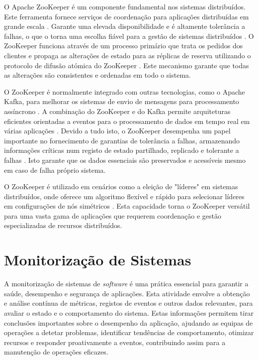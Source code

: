 O Apache ZooKeeper é um componente fundamental nos sistemas distribuídos. Este ferramenta
fornece serviços de coordenação para aplicações distribuídas em grande escala \cite{zookeeper2018}. 
Garante uma elevada disponibilidade e é altamente tolerância a falhas, o que o torna uma escolha 
fiável para a gestão de sistemas distribuídos \cite{zookeeper2021}. O ZooKeeper funciona através de 
um processo primário que trata os pedidos dos clientes e propaga as alterações de estado para as 
réplicas de reserva utilizando o protocolo de difusão atómica do ZooKeeper \cite{zookeeper2011}. 
Este mecanismo garante que todas as alterações são consistentes e ordenadas em todo o sistema.

O ZooKeeper é normalmente integrado com outras tecnologias, como o Apache Kafka, para melhorar os 
sistemas de envio de mensagens para processamento assíncrono \cite{zookeeper2024}. A combinação do 
ZooKeeper e do Kafka permite arquiteturas eficientes orientadas a eventos para o processamento de 
dados em tempo real em várias aplicações \cite{zookeeper2021b}. Devido a tudo isto, o ZooKeeper 
desempenha um papel importante no fornecimento de garantias de tolerância a falhas, armazenando 
informações críticas num registo de estado partilhado, replicado e tolerante a falhas
\cite{zookeeper2017}. Isto garante que os dados essenciais são preservados e acessíveis mesmo
em caso de falha próprio sistema.

O ZooKeeper é utilizado em cenários como a eleição de "líderes" em sistemas distribuídos, onde 
oferece um algoritmo flexível e rápido para selecionar líderes em configurações de nós simétricos 
\cite{zookeeper2021c}. Esta capacidade torna o ZooKeeper versátil para uma vasta gama de aplicações 
que requerem coordenação e gestão especializadas de recursos distribuídos.

\section{Monitorização de Sistemas}

A monitorização de sistemas de \textit{software} é uma prática essencial para garantir a saúde, 
desempenho e segurança de aplicações. Esta atividade envolve a obtenção e análise contínua de métricas, 
registos de eventos e outros dados relevantes, para avaliar o estado e o comportamento 
do sistema. Estas informações permitem tirar conclusões importantes sobre o desempenho da aplicação, 
ajudando as equipas de operações a detetar problemas, identificar tendências de comportamento, 
otimizar recursos e responder proativamente a eventos, contribuindo assim para a manutenção de 
operações eficazes.

